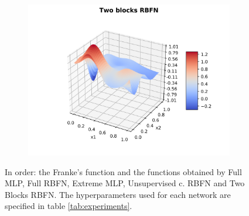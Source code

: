 \documentclass[a4paper]{article}
\numberwithin{equation}{section} %
\numberwithin{figure}{section} %
\numberwithin{table}{section} %
\theoremstyle{definition}
\begin{document}
\begin{figure}[H]
\begin{subfigure}{.32\textwidth}
	\end{subfigure}
  \begin{subfigure}{.32\textwidth}
    \centering
    \includegraphics[width=1.0\linewidth]{images/RBFN_BLOCK_N_70_sigma_025_rho_1e-05.png}
  \end{subfigure}
	\caption{In order: the Franke's function and the functions obtained by
		Full MLP, Full RBFN, Extreme MLP, Unsupervised c. RBFN and Two Blocks RBFN.
		The hyperparameters used for each network are specified in table
		\ref{tab:experiments}.}
	\label{fig:plots}
\end{figure}


%
%

\end{document}
